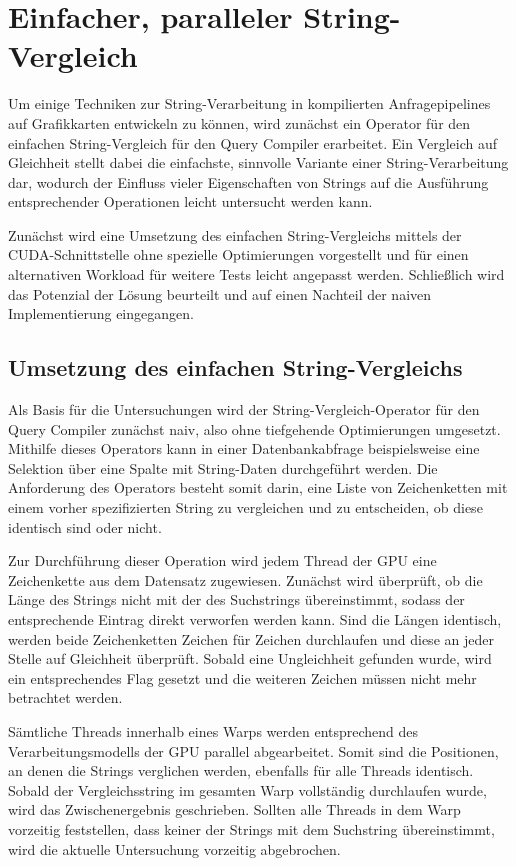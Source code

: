 \chapter{Einfacher, paralleler String-Vergleich}
\label{sec:equals_naiv}

Um einige Techniken zur String-Verarbeitung in kompilierten Anfragepipelines auf Grafikkarten entwickeln zu können, wird zunächst ein Operator für den einfachen String-Vergleich für den Query Compiler erarbeitet.
Ein Vergleich auf Gleichheit stellt dabei die einfachste, sinnvolle Variante einer String-Verarbeitung dar, wodurch der Einfluss vieler Eigenschaften von Strings auf die Ausführung entsprechender Operationen leicht untersucht werden kann.

Zunächst wird eine Umsetzung des einfachen String-Vergleichs mittels der CUDA-Schnittstelle ohne spezielle Optimierungen vorgestellt und für einen alternativen Workload für weitere Tests leicht angepasst werden.
Schließlich wird das Potenzial der Lösung beurteilt und auf einen Nachteil der naiven Implementierung eingegangen.

\section{Umsetzung des einfachen String-Vergleichs}
\label{sec:equals_umsetzung}

Als Basis für die Untersuchungen wird der String-Vergleich-Operator für den Query Compiler zunächst naiv, also ohne tiefgehende Optimierungen umgesetzt.
Mithilfe dieses Operators kann in einer Datenbankabfrage beispielsweise eine Selektion über eine Spalte mit String-Daten durchgeführt werden.
Die Anforderung des Operators besteht somit darin, eine Liste von Zeichenketten mit einem vorher spezifizierten String zu vergleichen und zu entscheiden, ob diese identisch sind oder nicht.

Zur Durchführung dieser Operation wird jedem Thread der GPU eine Zeichenkette aus dem Datensatz zugewiesen.
Zunächst wird überprüft, ob die Länge des Strings nicht mit der des Suchstrings übereinstimmt, sodass der entsprechende Eintrag direkt verworfen werden kann.
Sind die Längen identisch, werden beide Zeichenketten Zeichen für Zeichen durchlaufen und diese an jeder Stelle auf Gleichheit überprüft.
Sobald eine Ungleichheit gefunden wurde, wird ein entsprechendes Flag gesetzt und die weiteren Zeichen müssen nicht mehr betrachtet werden.

Sämtliche Threads innerhalb eines Warps werden entsprechend des Verarbeitungsmodells der GPU parallel abgearbeitet.
Somit sind die Positionen, an denen die Strings verglichen werden, ebenfalls für alle Threads identisch.
Sobald der Vergleichsstring im gesamten Warp vollständig durchlaufen wurde, wird das Zwischenergebnis geschrieben.
Sollten alle Threads in dem Warp vorzeitig feststellen, dass keiner der Strings mit dem Suchstring übereinstimmt, wird die aktuelle Untersuchung vorzeitig abgebrochen.

